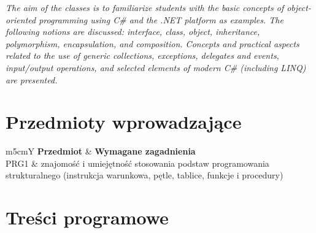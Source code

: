 \documentclass[12pt, a4paper]{article}
\newcommand{\thdrule}{\noalign{\global\setlength{\extrarowheight}{0pt}}}
\newcommand{\thdend}{\noalign{\global\setlength{\extrarowheight}{3pt}}}
\begin{document}
\textit{The aim of the classes is to familiarize students with the basic concepts of object-oriented programming using C\# and the .NET platform as examples. The following notions are discussed: interface, class, object, inheritance, polymorphism, encapsulation, and composition. Concepts and practical aspects related to the use of generic collections, exceptions, delegates and events, input/output operations, and selected elements of modern C\# (including LINQ) are presented.}


\section{Przedmioty wprowadzające}

{\scriptsize
\begin{tabularx}{\textwidth}{m{5cm}Y}
\thdrule\toprule
{} {\color{white}\textbf{Przedmiot}} & {\color{white}\textbf{Wymagane zagadnienia}} \\
\midrule\thdend
   PRG1 & znajomość i umiejętność stosowania podstaw programowania strukturalnego (instrukcja warunkowa, pętle, tablice, funkcje i procedury) \\
\bottomrule
\end{tabularx}}

\section{Treści programowe}
\end{document}
